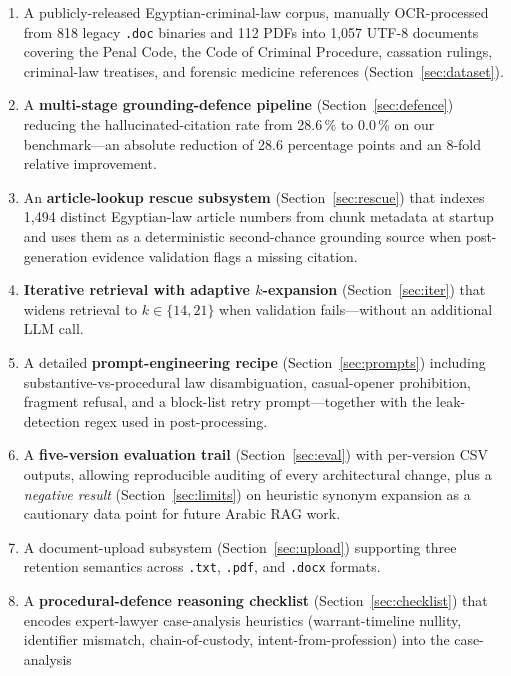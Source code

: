 \documentclass[final,1p,times]{elsarticle}
\begin{document}
\begin{enumerate}
  \item A publicly-released Egyptian-criminal-law corpus, manually
        OCR-processed from 818 legacy \texttt{.doc} binaries and 112 PDFs into
        1{,}057 UTF-8 documents covering the Penal Code, the Code of Criminal
        Procedure, cassation rulings, criminal-law treatises, and forensic
        medicine references (Section~\ref{sec:dataset}).
  \item A \textbf{multi-stage grounding-defence pipeline}
        (Section~\ref{sec:defence}) reducing the hallucinated-citation rate
        from 28.6\,\% to 0.0\,\% on our benchmark---an absolute reduction of
        28.6 percentage points and an 8-fold relative improvement.
  \item An \textbf{article-lookup rescue subsystem} (Section~\ref{sec:rescue})
        that indexes 1{,}494 distinct Egyptian-law article numbers from chunk
        metadata at startup and uses them as a deterministic second-chance
        grounding source when post-generation evidence validation flags a
        missing citation.
  \item \textbf{Iterative retrieval with adaptive $k$-expansion}
        (Section~\ref{sec:iter}) that widens retrieval to $k\!\in\!\{14,21\}$
        when validation fails---without an additional LLM call.
  \item A detailed \textbf{prompt-engineering recipe}
        (Section~\ref{sec:prompts}) including substantive-vs-procedural law
        disambiguation, casual-opener prohibition, fragment refusal, and a
        block-list retry prompt---together with the leak-detection regex
        used in post-processing.
  \item A \textbf{five-version evaluation trail} (Section~\ref{sec:eval}) with
        per-version CSV outputs, allowing reproducible auditing of every
        architectural change, plus a \emph{negative result} (Section~\ref{sec:limits})
        on heuristic synonym expansion as a cautionary data point for future
        Arabic RAG work.
  \item A document-upload subsystem (Section~\ref{sec:upload}) supporting
        three retention semantics across \texttt{.txt}, \texttt{.pdf}, and
        \texttt{.docx} formats.
  \item A \textbf{procedural-defence reasoning checklist}
        (Section~\ref{sec:checklist}) that encodes expert-lawyer case-analysis
        heuristics (warrant-timeline nullity, identifier mismatch,
        chain-of-custody, intent-from-profession) into the case-analysis

\end{enumerate}
\end{document}
